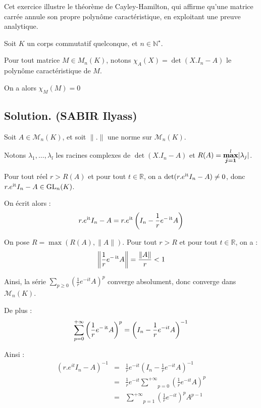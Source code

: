 Cet exercice illustre le th{\'e}or{\`e}me de Cayley-Hamilton, qui affirme
qu'une matrice carr{\'e}e annule son propre polyn{\^o}me caract{\'e}ristique,
en exploitant une preuve analytique.
\begin{exercise}
Soit $K$ un corps commutatif quelconque, et $n \in \mathbb{N}^{\star}$.

Pour tout matrice $M \in M_n (K)$, notons $\chi_A (X) = \det (X.I_n - A) $ le
polyn{\^o}me caract{\'e}ristique de $M$.

On a alors $\chi_M (M) = 0 $

\end{exercise}

\subsection*{Solution. (SABIR Ilyass)}


Soit $A \in \mathcal{M}_n (K)$, et soit $\| . \|$ une norme sur $\mathcal{M}_n
(K)$.

Notons $\lambda_1, \ldots, \lambda_l$ les racines complexes de $\det (X.I_n -
A)$ et $R (A) = \overset{l}{\boldsymbol{\underset{j = 1}{\max}}} | \lambda_j |$.

Pour tout r{\'e}el $r > R (A)$ et pour tout $t \in \mathbb{R}$, on a $\det
(r.e^{\operatorname{it}} I_n - A) \neq 0$, donc $r.e^{\operatorname{it}} I_n - A \in
\operatorname{GL}_n (K)$.

On {\'e}crit alors :
\[ r.e^{\operatorname{it}} I_n - A = r.e^{\operatorname{it}} \left( I_n - \frac{1}{r} e^{-
   \operatorname{it}} A \right) \]


On pose $R = \max (R (A), \| A \|)$. Pour tout $r > R$ et pour tout $t \in
\mathbb{R}$, on a :
\[ \left\| \frac{1}{r} e^{- \operatorname{it}} A \right\| = \frac{\| A \|}{r} < 1 \]


Ainsi, la s{\'e}rie $\underset{p \geqslant 0}{\sum} \left( \frac{1}{r} e^{- i
t} A \right)^p$ converge absolument, donc converge dans $\mathcal{M}_n (K)$.

De plus :
\[ \underset{p = 0}{\overset{+ \infty}{\sum}} \left( \frac{1}{r} e^{-
   \operatorname{it}} A \right)^p = \left( I_n - \frac{1}{r} e^{- i t} A \right)^{- 1}
\]


Ainsi :
\begin{eqnarray*}
  (r.e^{i t} I_n - A)^{- 1} & = & \frac{1}{r} e^{- i t} \left( I_n -
  \frac{1}{r} e^{- i t} A \right)^{- 1}\\
  & = & \frac{1}{r} e^{- i t} \underset{p = 0}{\overset{+ \infty}{\sum}}
  \left( \frac{1}{r} e^{- i t} A \right)^p\\
  & = & \underset{p = 1}{\overset{+ \infty}{\sum}} \left( \frac{1}{r} e^{- i
  t} \right)^p A^{p - 1}
\end{eqnarray*}


